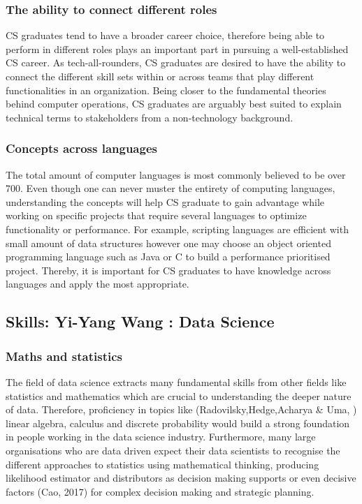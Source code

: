 \documentclass[a4paper, 11pt]{report}
\begin{document}
\subsubsection{The ability to connect different roles}
CS graduates tend to have a broader career choice, therefore being able to perform in different roles plays an important part in pursuing a well-established CS career. As tech-all-rounders, CS graduates are desired to have the ability to connect the different skill sets within or across teams that play different functionalities in an organization. Being closer to the fundamental theories behind computer operations, CS graduates are arguably best suited to explain technical terms to stakeholders from a non-technology background.
\subsubsection{Concepts across languages}
The total amount of computer languages is most commonly believed to be over 700. Even though one can never muster the entirety of computing languages, understanding the concepts will help CS graduate to gain advantage while working on specific projects that require several languages to optimize functionality or performance. For example, scripting languages are efficient with small amount of data structures however one may choose an object oriented programming language such as Java or C to build a performance prioritised project. Thereby, it is important for CS graduates to have knowledge across languages and apply the most appropriate.

\subsection{Skills: Yi-Yang Wang : Data Science}

\subsubsection{Maths and statistics}
The field of data science extracts many fundamental skills from other fields like statistics and mathematics which are crucial to understanding the deeper nature of data. Therefore, proficiency in topics like (Radovilsky,Hedge,Acharya \& Uma, ) linear algebra, calculus and discrete probability would build a strong foundation in people working in the data science industry. Furthermore, many large organisations who are data driven expect their data scientists to recognise the different approaches to statistics using mathematical thinking, producing likelihood estimator and distributors as decision making supports or even decisive factors (Cao, 2017) for complex decision making and strategic planning. 
\end{document}
